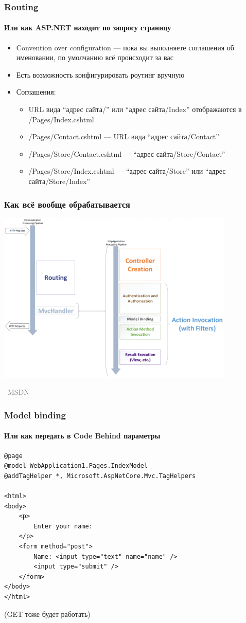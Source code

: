 \documentclass[xetex,mathserif,serif]{beamer}
\newcommand{\attribution}[1] {
\vspace{-5mm}\begin{flushright}\begin{scriptsize}\textcolor{gray}{\textcopyright\, #1}\end{scriptsize}\end{flushright}
}
\begin{document}
	\begin{frame}
		\frametitle{Routing}
		\framesubtitle{Или как ASP.NET находит по запросу страницу}
		\begin{itemize}
			\item Convention over configuration --- пока вы выполняете соглашения об именовании, по умолчанию всё происходит за вас
			\item Есть возможность конфигурировать роутинг вручную
			\item Соглашения:
			\begin{itemize}
				\item URL вида ``адрес сайта/'' или ``адрес сайта/Index'' отображаются в /Pages/Index.cshtml
				\item /Pages/Contact.cshtml --- URL вида ``адрес сайта/Contact''
				\item /Pages/Store/Contact.cshtml --- ``адрес сайта/Store/Contact''
				\item /Pages/Store/Index.cshtml --- ``адрес сайта/Store'' или ``адрес сайта/Store/Index''
			\end{itemize}
		\end{itemize}
	\end{frame}

	\begin{frame}
		\frametitle{Как всё вообще обрабатывается}
		\begin{center}
			\includegraphics[width=0.85\textwidth]{requestLifecycle.png}
			\vspace{-5mm}
			\attribution{MSDN}
		\end{center}
	\end{frame}

	\begin{frame}[fragile]
		\frametitle{Model binding}
		\framesubtitle{Или как передать в Code Behind параметры}
		\begin{small}
			\begin{verbatim}
@page
@model WebApplication1.Pages.IndexModel
@addTagHelper *, Microsoft.AspNetCore.Mvc.TagHelpers

<html>
<body>
    <p>
        Enter your name:
    </p>
    <form method="post">
        Name: <input type="text" name="name" />
        <input type="submit" />
    </form>
</body>
</html>
			\end{verbatim}
		\end{small}
		(GET тоже будет работать)
	\end{frame}
\end{document}
